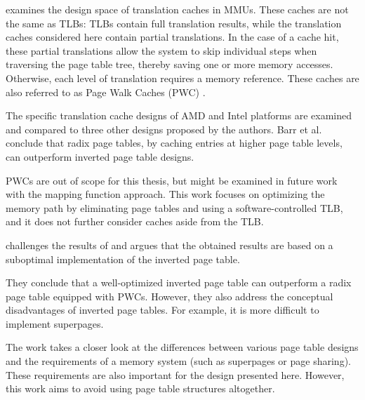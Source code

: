 
\textbf{\cite{barrTranslationCachingSkip}} examines the design space of translation caches in MMUs. These caches are not the same as TLBs: TLBs contain full translation results, while the translation caches considered here contain partial translations. In the case of a cache hit, these partial translations allow the system to skip individual steps when traversing the page table tree, thereby saving one or more memory accesses. Otherwise, each level of translation requires a memory reference. These caches are also referred to as Page Walk Caches (PWC) \cite{yaniv2016hash}.

The specific translation cache designs of AMD and Intel platforms are examined and compared to three other designs proposed by the authors. Barr et al. conclude that radix page tables, by caching entries at higher page table levels, can outperform inverted page table designs.

PWCs are out of scope for this thesis, but might be examined in future work with the mapping function approach. This work focuses on optimizing the memory path by eliminating page tables and using a software-controlled TLB, and it does not further consider caches aside from the TLB.




\textbf{\cite{yaniv2016hash}} challenges the results of \cite{barrTranslationCachingSkip} and argues that the obtained results are based on a suboptimal implementation of the inverted page table.

They conclude that a well-optimized inverted page table can outperform a radix page table equipped with PWCs. However, they also address the conceptual disadvantages of inverted page tables. For example, it is more difficult to implement superpages.

The work takes a closer look at the differences between various page table designs and the requirements of a memory system (such as superpages or page sharing). These requirements are also important for the design presented here. However, this work aims to avoid using page table structures altogether.



